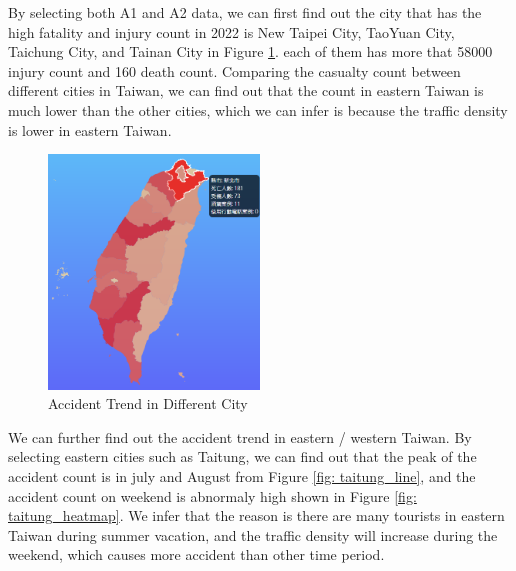 \documentclass[a4paper, oneside, final, 12pt]{scrartcl} %
\begin{document}
By selecting both A1 and A2 data, we can first find out the city
that has the high fatality and injury count in 2022 is New Taipei City,
TaoYuan City, Taichung City, and Tainan City in Figure \ref{fig: insight_trend_map}.
each of them has more that 58000 injury count and 160 death count.
Comparing the casualty count between different cities in Taiwan,
we can find out that the count in eastern Taiwan is much lower than the other cities,
which we can infer is because the traffic density is lower in eastern Taiwan.

\begin{figure}[htbp]
  \centering
  \includegraphics[width=0.5\textwidth]{"./Image/insight_trend_map.png"}
  \caption{Accident Trend in Different City}
  \label{fig: insight_trend_map}
\end{figure}

We can further find out the accident trend in eastern / western Taiwan.
By selecting eastern cities such as Taitung, 
we can find out that the peak of the accident count
is in july and August from Figure \ref{fig: taitung_line},
and the accident count on weekend is abnormaly high shown in Figure \ref{fig: taitung_heatmap}.
We infer that the reason is there are many tourists in eastern Taiwan during summer vacation,
and the traffic density will increase during the weekend, 
which causes more accident than other time period.
\end{document}
